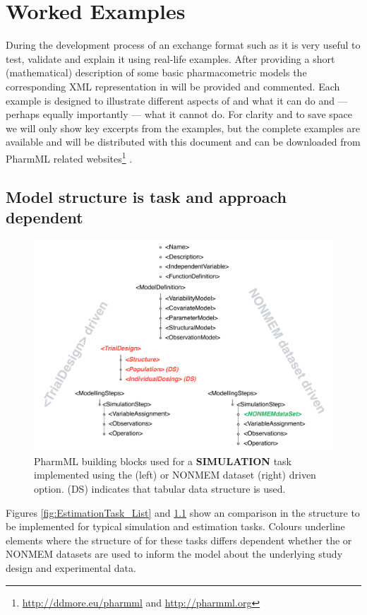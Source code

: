 \chapter{Worked Examples}
\label{chap:worked-egs}

During the development process of an exchange format such as \pharmml it is 
very useful to test, validate and explain it using real-life examples. 
After providing a short (mathematical) description of some basic pharmacometric 
models the corresponding XML representation in \pharmml will be provided and
commented. Each example is designed to illustrate different aspects of 
\pharmml and what it can do and --- perhaps equally importantly --- what it cannot 
do. For clarity and to save space we will only show key excerpts from the
examples, but the complete examples are available and will be
distributed with this document and can be downloaded from PharmML related 
websites\footnote{\url{http://ddmore.eu/pharmml} and \url{http://pharmml.org}} . 

\section{Model structure is task and approach dependent}
\label{sec:eg-modelStructure}

\begin{figure}[ht!]
 \centering	
 \includegraphics[width=.8\linewidth]{pics/SimulationTask}%
 \caption{PharmML building blocks used for a \textbf{SIMULATION} task implemented 
 using the  (left) or NONMEM dataset (right) driven option. 
(DS) indicates that tabular data structure is used.}
 \label{fig:SimulationTask_List}
 \end{figure}
Figures \ref{fig:EstimationTask_List} and \ref{fig:SimulationTask_List} show 
an comparison in the structure to be implemented for typical simulation 
and estimation tasks.
Colours underline elements where the structure of 
\pharmml for these tasks differs dependent whether the 
or NONMEM datasets are used to inform the model about the underlying 
study design and experimental data.

